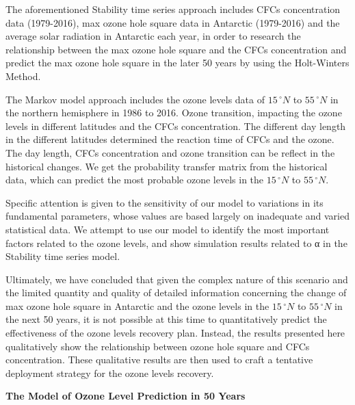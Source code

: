 \documentclass[12pt]{article}
\begin{document}
The aforementioned Stability time series approach includes CFCs concentration data (1979-2016), max ozone hole square data in Antarctic (1979-2016) and the average solar radiation in Antarctic each year, in order to research the relationship between the max ozone hole square and the CFCs concentration and predict the max ozone hole square in the later 50 years by using the Holt-Winters Method. 

The Markov model approach includes the ozone levels data of $15\,^{\circ}N$ to $55\,^{\circ}N$ in the northern hemisphere in 1986 to 2016. Ozone transition, impacting the ozone levels in different latitudes and the CFCs concentration. The different day length in the different latitudes determined the reaction time of CFCs and the ozone. The day length, CFCs concentration and ozone transition can be reflect in the historical changes. We get the probability transfer matrix from the historical data, which can predict the most probable ozone levels in the $15\,^{\circ}N$ to $55\,^{\circ}N$.

Specific attention is given to the sensitivity of our model to variations in its fundamental parameters, whose values are based largely on inadequate and varied statistical data. We attempt to use our model to identify the most important factors related to the ozone levels, and show simulation results related to α in the Stability time series model.

Ultimately, we have concluded that given the complex nature of this scenario and the limited quantity and quality of detailed information concerning the change of max ozone hole square in Antarctic and the ozone levels in the $15 \,^{\circ}N$ to $55\,^{\circ}N$ in the next 50 years, it is not possible at this time to quantitatively predict the effectiveness of the ozone levels recovery plan. Instead, the results presented here qualitatively show the relationship between ozone hole square and CFCs concentration. These qualitative results are then used to craft a tentative deployment strategy for the ozone levels recovery.
\newpage

\thispagestyle{empty}
\setcounter{page}{0}
{\begin{center}\Large \textbf{The Model of Ozone Level Prediction in 50 Years}\end{center}}
\tableofcontents                                                  %
\newpage                                                          %
\end{document}
